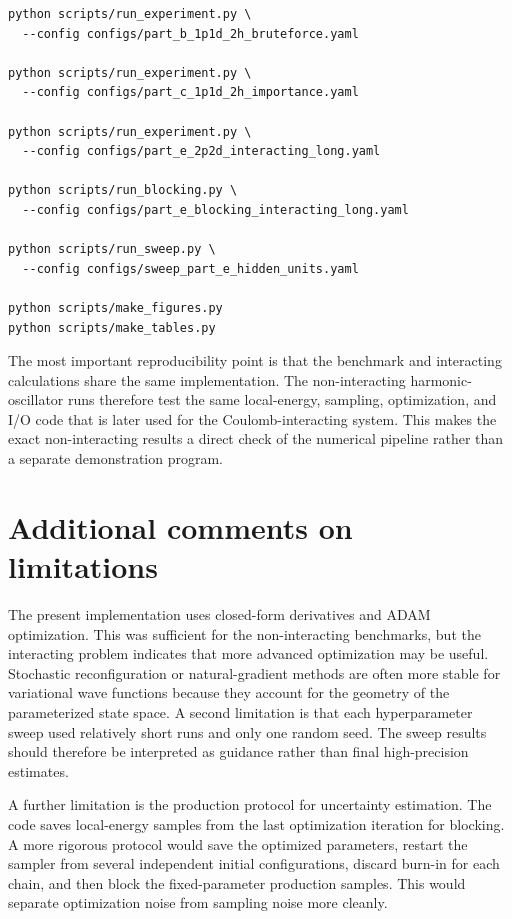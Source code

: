 \documentclass[10pt,a4paper]{article}
\begin{document}
\begin{lstlisting}[caption={Examples of individual run commands.},label={lst:runs},basicstyle=\ttfamily\small]
python scripts/run_experiment.py \
  --config configs/part_b_1p1d_2h_bruteforce.yaml

python scripts/run_experiment.py \
  --config configs/part_c_1p1d_2h_importance.yaml

python scripts/run_experiment.py \
  --config configs/part_e_2p2d_interacting_long.yaml

python scripts/run_blocking.py \
  --config configs/part_e_blocking_interacting_long.yaml

python scripts/run_sweep.py \
  --config configs/sweep_part_e_hidden_units.yaml

python scripts/make_figures.py
python scripts/make_tables.py
\end{lstlisting}

The most important reproducibility point is that the benchmark and interacting calculations share the same implementation.  The non-interacting harmonic-oscillator runs therefore test the same local-energy, sampling, optimization, and I/O code that is later used for the Coulomb-interacting system.  This makes the exact non-interacting results a direct check of the numerical pipeline rather than a separate demonstration program.

\section{Additional comments on limitations}\label{app:limitations}

The present implementation uses closed-form derivatives and ADAM optimization. This was sufficient for the non-interacting benchmarks, but the interacting problem indicates that more advanced optimization may be useful. Stochastic reconfiguration or natural-gradient methods are often more stable for variational wave functions because they account for the geometry of the parameterized state space. A second limitation is that each hyperparameter sweep used relatively short runs and only one random seed. The sweep results should therefore be interpreted as guidance rather than final high-precision estimates.

A further limitation is the production protocol for uncertainty estimation. The code saves local-energy samples from the last optimization iteration for blocking. A more rigorous protocol would save the optimized parameters, restart the sampler from several independent initial configurations, discard burn-in for each chain, and then block the fixed-parameter production samples. This would separate optimization noise from sampling noise more cleanly.
\end{document}
